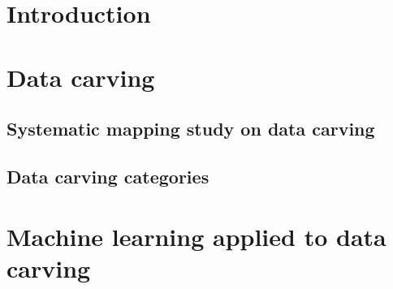 \chapter{Introduction}


    
    
    

\chapter{Data carving}


    \section{Systematic mapping study on data carving}
    \label{sec:data-carving-sms}
    
    
    \section{Data carving categories}
    \label{sec:data-carving-taxonomies}
    
    
    \label{sec:data-carving-existing-tools}
    
    

\chapter{Machine learning applied to data carving}


    

